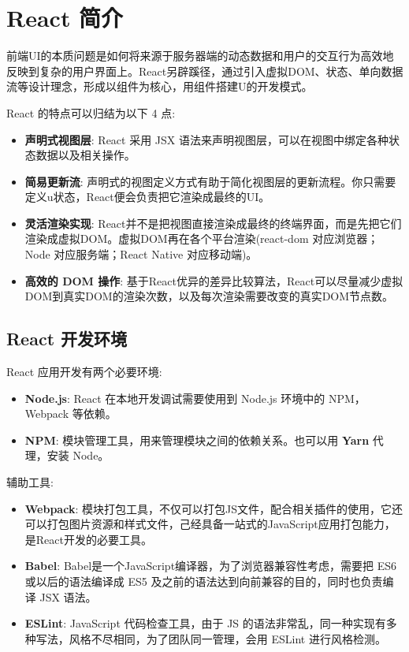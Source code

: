 \section{React 简介}

前端UI的本质问题是如何将来源于服务器端的动态数据和用户的交互行为高效地反映到复杂的用户界面上。React另辟蹊径，通过引入虚拟DOM、状态、单向数据流等设计理念，形成以组件为核心，用组件搭建U的开发模式。

React 的特点可以归结为以下 4 点:
\begin{itemize}
    \item \textbf{声明式视图层}: React 采用 JSX 语法来声明视图层，可以在视图中绑定各种状态数据以及相关操作。
    \item \textbf{简易更新流}: 声明式的视图定义方式有助于简化视图层的更新流程。你只需要定义u状态，React便会负责把它渲染成最终的UI。
    \item \textbf{灵活渲染实现}: React并不是把视图直接渲染成最终的终端界面，而是先把它们渲染成虚拟DOM。虚拟DOM再在各个平台渲染(react-dom 对应浏览器；Node 对应服务端；React Native 对应移动端)。
    \item \textbf{高效的 DOM 操作}: 基于React优异的差异比较算法，React可以尽量减少虚拟DOM到真实DOM的渲染次数，以及每次渲染需要改变的真实DOM节点数。
\end{itemize}

\subsection{React 开发环境}

React 应用开发有两个必要环境:
\begin{itemize}
    \item \textbf{Node.js}: React 在本地开发调试需要使用到 Node.js 环境中的 NPM，Webpack 等依赖。
    \item \textbf{NPM}: 模块管理工具，用来管理模块之间的依赖关系。也可以用 \textbf{Yarn} 代理，安装 Node。
\end{itemize}

辅助工具:
\begin{itemize}
    \item \textbf{Webpack}: 模块打包工具，不仅可以打包JS文件，配合相关插件的使用，它还可以打包图片资源和样式文件，己经具备一站式的JavaScript应用打包能力，是React开发的必要工具。
    \item \textbf{Babel}: Babel是一个JavaScript编译器，为了浏览器兼容性考虑，需要把 ES6 或以后的语法编译成 ES5 及之前的语法达到向前兼容的目的，同时也负责编译 JSX 语法。
    \item \textbf{ESLint}: JavaScript 代码检查工具，由于 JS 的语法非常乱，同一种实现有多种写法，风格不尽相同，为了团队同一管理，会用 ESLint 进行风格检测。
\end{itemize}

